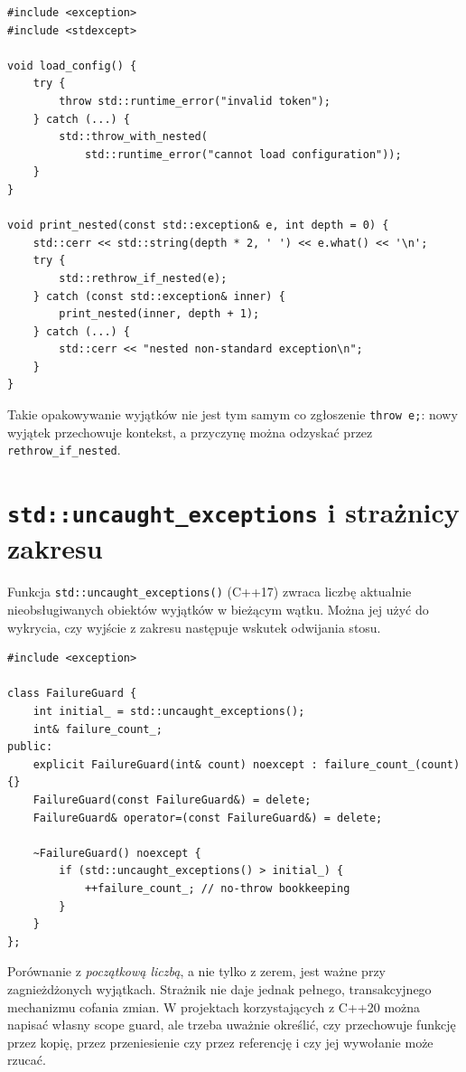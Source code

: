 \begin{lstlisting}
#include <exception>
#include <stdexcept>

void load_config() {
    try {
        throw std::runtime_error("invalid token");
    } catch (...) {
        std::throw_with_nested(
            std::runtime_error("cannot load configuration"));
    }
}

void print_nested(const std::exception& e, int depth = 0) {
    std::cerr << std::string(depth * 2, ' ') << e.what() << '\n';
    try {
        std::rethrow_if_nested(e);
    } catch (const std::exception& inner) {
        print_nested(inner, depth + 1);
    } catch (...) {
        std::cerr << "nested non-standard exception\n";
    }
}
\end{lstlisting}

Takie opakowywanie wyjątków nie jest tym
samym co zgłoszenie \texttt{throw e;}: nowy wyjątek przechowuje
kontekst, a przyczynę można odzyskać przez \texttt{rethrow\_if\_nested}.

\section{\texttt{std::uncaught\_exceptions} i strażnicy zakresu}

Funkcja \texttt{std::uncaught\_exceptions()} (C++17) zwraca liczbę
aktualnie nieobsługiwanych obiektów wyjątków w bieżącym wątku.
Można jej użyć do wykrycia, czy wyjście z zakresu następuje wskutek
odwijania stosu.

\begin{lstlisting}
#include <exception>

class FailureGuard {
    int initial_ = std::uncaught_exceptions();
    int& failure_count_;
public:
    explicit FailureGuard(int& count) noexcept : failure_count_(count) {}
    FailureGuard(const FailureGuard&) = delete;
    FailureGuard& operator=(const FailureGuard&) = delete;

    ~FailureGuard() noexcept {
        if (std::uncaught_exceptions() > initial_) {
            ++failure_count_; // no-throw bookkeeping
        }
    }
};
\end{lstlisting}

Porównanie z \emph{początkową liczbą}, a nie tylko z zerem, jest
ważne przy zagnieżdżonych wyjątkach. Strażnik nie daje jednak
pełnego, transakcyjnego mechanizmu cofania zmian. W projektach
korzystających z C++20 można napisać własny scope guard, ale trzeba
uważnie określić, czy przechowuje funkcję przez kopię, przez
przeniesienie czy przez referencję i czy jej wywołanie może rzucać.

